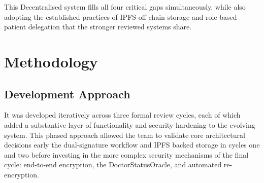 \documentclass[12pt,a4wide]{report}
\begin{document}
\begin{table}[H]
\centering
\caption{Feature comparison: prior systems versus the proposed system}
\label{tab:comparison}

\end{table}

This Decentralised system fills all four critical gaps simultaneously, while also adopting the
established practices of IPFS off-chain storage and role based patient delegation
that the stronger reviewed systems share.

\chapter{Methodology}

\section{Development Approach}

It was developed iteratively across three formal review cycles, each of
which added a substantive layer of functionality and security hardening to the
evolving system. This phased approach allowed the team to validate core architectural
decisions early the dual-signature workflow and IPFS backed storage in cycles
one and two before investing in the more complex security mechanisms of the
final cycle: end-to-end encryption, the DoctorStatusOracle, and automated
re-encryption.
\end{document}
